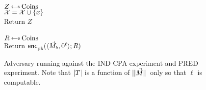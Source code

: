 \begin{figure}[tbhp]
\begin{center}
{\\
  $Z \getsr \mathrm{Coins}$\\
  $\mathcal{X} = \mathcal{X} \cup \{x\}$ \\
  Return $Z$\\

\\
$R \getsr \mathrm{Coins}$\\
Return ${\mathsf{enc}}_{\mathrm{pk}}^{}(\langle \vec{M}_b,0^{\ell}\rangle;R)$\\
}
\caption{Adversary running against the IND-CPA experiment and PRED experiment.
Note that $|T|$ is a function of $||\vec{M}||$ only so that $\ell$ is computable.}
\label{fig:CPA-adv}
\end{center}
\end{figure}


